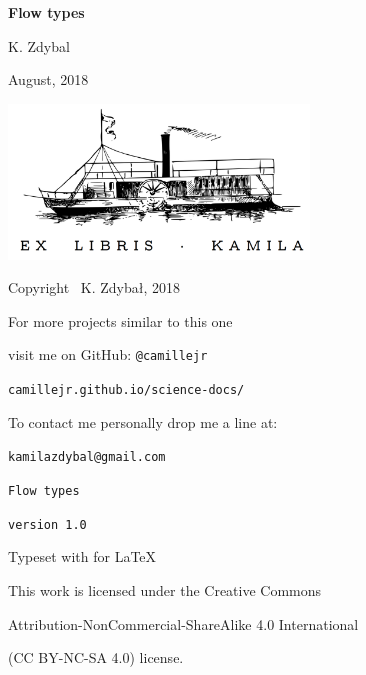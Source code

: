 \documentclass[10pt]{article}
\begin{document}
\begin{titlepage}
    \begin{center}

		\vspace*{7cm}    

        \Huge
        \textbf{Flow types}
        
        
        \vspace*{0.5cm}
        
        \Large


		\Large

        \vspace{2cm}
        
        \LARGE

        K. Zdybal

        \vspace{10.5cm}
        
		\Large

 		August, 2018
	\end{center}
\end{titlepage}


\thispagestyle{empty}
\begin{center}
\vspace*{4cm}
\includegraphics[width = 80mm]{ex_libris.png}

\vspace*{2cm}

Copyright \textcopyright \, K. Zdybał, 2018

For more projects similar to this one

visit me on GitHub: \verb|@camillejr|

\verb|camillejr.github.io/science-docs/|

To contact me personally drop me a line at:

\verb|kamilazdybal@gmail.com|

\vspace*{2cm}

\verb|Flow types|

\verb|version 1.0|

Typeset with  for \LaTeX

\vspace*{1.8cm}

\noindent This work is licensed under the Creative Commons

Attribution-NonCommercial-ShareAlike 4.0 International 

(CC BY-NC-SA
4.0) license.
\end{center}
\end{document}
